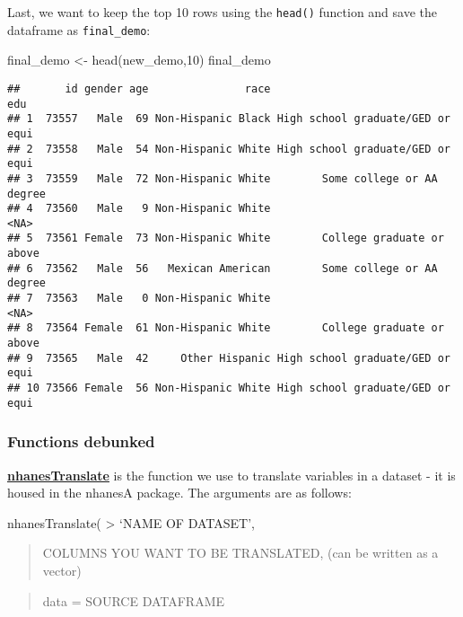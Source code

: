\documentclass[
]{book}
\newenvironment{Shaded}{\begin{snugshade}}{\end{snugshade}}
\newcommand{\DecValTok}[1]{\textcolor[rgb]{0.00,0.00,0.81}{#1}}
\newcommand{\FunctionTok}[1]{\textcolor[rgb]{0.00,0.00,0.00}{#1}}
\newcommand{\NormalTok}[1]{#1}
\newcommand{\OtherTok}[1]{\textcolor[rgb]{0.56,0.35,0.01}{#1}}
\begin{document}
Last, we want to keep the top 10 rows using the \texttt{head()} function and save the dataframe as \texttt{final\_demo}:

\begin{Shaded}
\begin{Highlighting}[]
\NormalTok{final\_demo }\OtherTok{\textless{}{-}} \FunctionTok{head}\NormalTok{(new\_demo,}\DecValTok{10}\NormalTok{)}
\NormalTok{final\_demo}
\end{Highlighting}
\end{Shaded}

\begin{verbatim}
##       id gender age               race                              edu
## 1  73557   Male  69 Non-Hispanic Black High school graduate/GED or equi
## 2  73558   Male  54 Non-Hispanic White High school graduate/GED or equi
## 3  73559   Male  72 Non-Hispanic White        Some college or AA degree
## 4  73560   Male   9 Non-Hispanic White                             <NA>
## 5  73561 Female  73 Non-Hispanic White        College graduate or above
## 6  73562   Male  56   Mexican American        Some college or AA degree
## 7  73563   Male   0 Non-Hispanic White                             <NA>
## 8  73564 Female  61 Non-Hispanic White        College graduate or above
## 9  73565   Male  42     Other Hispanic High school graduate/GED or equi
## 10 73566 Female  56 Non-Hispanic White High school graduate/GED or equi
\end{verbatim}

\hypertarget{functions-debunked-11}{%
\subsubsection{Functions debunked}\label{functions-debunked-11}}

\href{https://www.rdocumentation.org/packages/nhanesA/versions/0.6.5.3/topics/nhanesTranslate}{\textbf{nhanesTranslate}} is the function we use to translate variables in a dataset - it is housed in the nhanesA package. The arguments are as follows:

nhanesTranslate(
\textgreater{} `NAME OF DATASET',

\begin{quote}
COLUMNS YOU WANT TO BE TRANSLATED, (can be written as a vector)
\end{quote}

\begin{quote}
data = SOURCE DATAFRAME
\end{quote}
\end{document}
